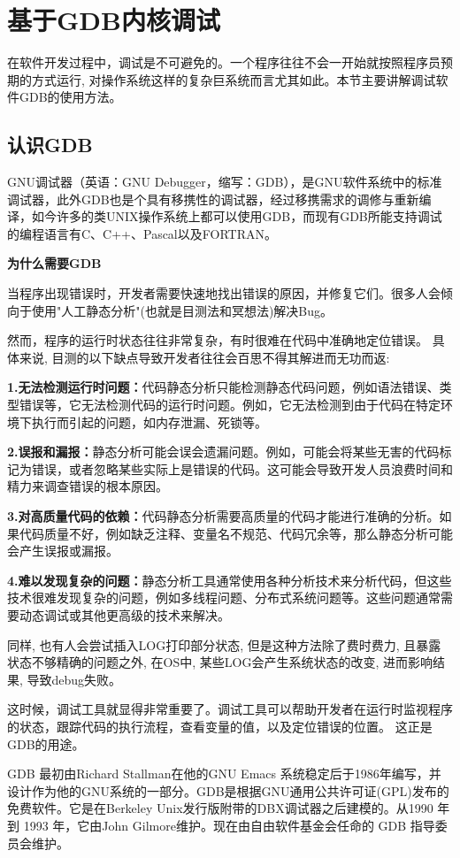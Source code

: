 
\section{基于GDB内核调试}
在软件开发过程中，调试是不可避免的。一个程序往往不会一开始就按照程序员预期的方式运行, 对操作系统这样的复杂巨系统而言尤其如此。本节主要讲解调试软件GDB的使用方法。
\subsection{认识GDB}
GNU调试器（英语：GNU Debugger，缩写：GDB），是GNU软件系统中的标准调试器，此外GDB也是个具有移携性的调试器，经过移携需求的调修与重新编译，如今许多的类UNIX操作系统上都可以使用GDB，而现有GDB所能支持调试的编程语言有C、C++、Pascal以及FORTRAN。

\textbf{为什么需要GDB}

当程序出现错误时，开发者需要快速地找出错误的原因，并修复它们。很多人会倾向于使用"人工静态分析"(也就是目测法和冥想法)解决Bug。

然而，程序的运行时状态往往非常复杂，有时很难在代码中准确地定位错误。 具体来说, 目测的以下缺点导致开发者往往会百思不得其解进而无功而返:

\textbf{1.无法检测运行时问题：}代码静态分析只能检测静态代码问题，例如语法错误、类型错误等，它无法检测代码的运行时问题。例如，它无法检测到由于代码在特定环境下执行而引起的问题，如内存泄漏、死锁等。

\textbf{2.误报和漏报：}静态分析可能会误会遗漏问题。例如，可能会将某些无害的代码标记为错误，或者忽略某些实际上是错误的代码。这可能会导致开发人员浪费时间和精力来调查错误的根本原因。

\textbf{3.对高质量代码的依赖：}代码静态分析需要高质量的代码才能进行准确的分析。如果代码质量不好，例如缺乏注释、变量名不规范、代码冗余等，那么静态分析可能会产生误报或漏报。

\textbf{4.难以发现复杂的问题：}静态分析工具通常使用各种分析技术来分析代码，但这些技术很难发现复杂的问题，例如多线程问题、分布式系统问题等。这些问题通常需要动态调试或其他更高级的技术来解决。

同样, 也有人会尝试插入LOG打印部分状态, 但是这种方法除了费时费力, 且暴露状态不够精确的问题之外, 在OS中, 某些LOG会产生系统状态的改变, 进而影响结果, 导致debug失败。

这时候，调试工具就显得非常重要了。调试工具可以帮助开发者在运行时监视程序的状态，跟踪代码的执行流程，查看变量的值，以及定位错误的位置。 这正是GDB的用途。

GDB 最初由Richard Stallman在他的GNU Emacs 系统稳定后于1986年编写，并设计作为他的GNU系统的一部分。GDB是根据GNU通用公共许可证(GPL)发布的免费软件。它是在Berkeley Unix发行版附带的DBX调试器之后建模的。从1990 年到 1993 年，它由John Gilmore维护。现在由自由软件基金会任命的 GDB 指导委员会维护。


